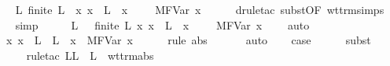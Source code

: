 \begin{isabellebody}
\ {}{\isacharparenleft}{}{\isacharparenright}\ \isamarkupfalse%
\ {\isachardoublequoteopen}{\isasymexists}L{\isachardot}\ finite\ L\ {\isasymand}\ {\isacharparenleft}{\isasymforall}x{\isachardot}\ x\ {\isasymnotin}\ L\ {\isasymlongrightarrow}\ {\isacharparenleft}x{\isacharcomma}\ {\isasympi}{\isacharparenright}\ {\isacharhash}\ {\isasymGamma}\ {\isasymturnstile}\ M{\isacharcircum}FVar\ x\ {\isacharcolon}\ {\isasymtau}{\isacharparenright}{\isachardoublequoteclose}\isanewline
\ \ \isamarkupfalse%
\ {\isacharparenleft}drule{\isacharunderscore}tac\ subst{\isacharbrackleft}OF\ wt{\isacharunderscore}trm{\isachardot}simps{\isacharbrackright}{\isacharparenright}\isanewline
\ \ \isamarkupfalse%
\ simp\isanewline
\ \ \isamarkupfalse%
\ \isamarkupfalse%
\ L{\isacharprime}\ \ {}{\isacharcolon}\ {\isachardoublequoteopen}finite\ L{\isacharprime}{\isachardoublequoteclose}\ {\isachardoublequoteopen}{\isasymAnd}x{\isachardot}\ x\ {\isasymnotin}\ L{\isacharprime}\ {\isasymLongrightarrow}\ {\isacharparenleft}x{\isacharcomma}\ {\isasympi}{\isacharparenright}\ {\isacharhash}\ {\isasymGamma}\ {\isasymturnstile}\ M{\isacharcircum}FVar\ x\ {\isacharcolon}\ {\isasymtau}{\isachardoublequoteclose}\ \isamarkupfalse%
\ auto\isanewline
\isanewline
\ \ \isamarkupfalse%
\ {}{\isacharcolon}\ {\isachardoublequoteopen}{\isasymAnd}x{\isachardot}\ x\ {\isasymnotin}\ L\ {\isasymunion}\ L{\isacharprime}\ {\isasymLongrightarrow}\ {\isacharparenleft}{\isacharparenleft}x{\isacharcomma}{\isasympi}{\isacharparenright}{\isacharhash}{\isasymGamma}{\isacharparenright}\ {\isasymturnstile}\ M{\isacharprime}{\isacharcircum}FVar\ x\ {\isacharcolon}\ {\isasymtau}{\isachardoublequoteclose}\isanewline
\ \ \isamarkupfalse%
\ {\isacharparenleft}rule\ abs{\isacharparenleft}{}{\isacharparenright}{\isacharparenright}\isanewline
\ \ \isamarkupfalse%
\ {}\ \isamarkupfalse%
\ auto\isanewline
\isanewline
\ \ \isamarkupfalse%
\ {\isacharquery}case\isanewline
\ \ \ \ \isamarkupfalse%
\ {\isacharparenleft}subst\ {}{\isacharparenleft}{}{\isacharparenright}{\isacharparenright}\isanewline
\ \ \ \ \isamarkupfalse%
\ {\isacharparenleft}rule{\isacharunderscore}tac\ L{\isacharequal}{\isachardoublequoteopen}L\ {\isasymunion}\ L{\isacharprime}{\isachardoublequoteclose}\ \ wt{\isacharunderscore}trm{\isachardot}abs{\isacharparenright}\isanewline

\end{isabellebody}
